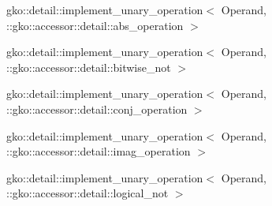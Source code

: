 \begin{DoxyCompactList}
\begin{DoxyCompactList}
\item {}
\end{DoxyCompactList}
\item gko\+:\+:detail\+:\+:implement\+\_\+unary\+\_\+operation$<$ Operand, \+:\+:gko\+:\+:accessor\+:\+:detail\+:\+:abs\+\_\+operation $>$\begin{DoxyCompactList}
\item {}
\end{DoxyCompactList}
\item gko\+:\+:detail\+:\+:implement\+\_\+unary\+\_\+operation$<$ Operand, \+:\+:gko\+:\+:accessor\+:\+:detail\+:\+:bitwise\+\_\+not $>$\begin{DoxyCompactList}
\item {}
\end{DoxyCompactList}
\item gko\+:\+:detail\+:\+:implement\+\_\+unary\+\_\+operation$<$ Operand, \+:\+:gko\+:\+:accessor\+:\+:detail\+:\+:conj\+\_\+operation $>$\begin{DoxyCompactList}
\item {}
\end{DoxyCompactList}
\item gko\+:\+:detail\+:\+:implement\+\_\+unary\+\_\+operation$<$ Operand, \+:\+:gko\+:\+:accessor\+:\+:detail\+:\+:imag\+\_\+operation $>$\begin{DoxyCompactList}
\item {}
\end{DoxyCompactList}
\item gko\+:\+:detail\+:\+:implement\+\_\+unary\+\_\+operation$<$ Operand, \+:\+:gko\+:\+:accessor\+:\+:detail\+:\+:logical\+\_\+not $>$\begin{DoxyCompactList}
\item {}
\end{DoxyCompactList}

\end{DoxyCompactList}
